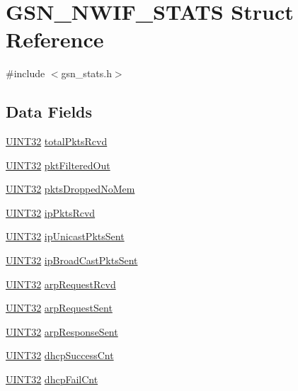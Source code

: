 \hypertarget{a00176}{
\section{GSN\_\-NWIF\_\-STATS Struct Reference}
\label{a00176}
}


{\ttfamily \#include $<$gsn\_\-stats.h$>$}

\subsection*{Data Fields}
\begin{DoxyCompactItemize}
\item 
\hyperlink{a00660_gae1e6edbbc26d6fbc71a90190d0266018}{UINT32} \hyperlink{a00176_a05ef4606fe87c63ea580827f8de8154a}{totalPktsRcvd}
\item 
\hyperlink{a00660_gae1e6edbbc26d6fbc71a90190d0266018}{UINT32} \hyperlink{a00176_a749aa965c1b0568a2852a53557e019cc}{pktFilteredOut}
\item 
\hyperlink{a00660_gae1e6edbbc26d6fbc71a90190d0266018}{UINT32} \hyperlink{a00176_ad206d718956ea79ad16f513d70d7f20f}{pktsDroppedNoMem}
\item 
\hyperlink{a00660_gae1e6edbbc26d6fbc71a90190d0266018}{UINT32} \hyperlink{a00176_ab0853f11aafbd4a050f502595dfe531d}{ipPktsRcvd}
\item 
\hyperlink{a00660_gae1e6edbbc26d6fbc71a90190d0266018}{UINT32} \hyperlink{a00176_aeb59035f4e2e10f2d2cc60150b27d790}{ipUnicastPktsSent}
\item 
\hyperlink{a00660_gae1e6edbbc26d6fbc71a90190d0266018}{UINT32} \hyperlink{a00176_aa1a3da8bb506ae4eea4ac1ed43c8000a}{ipBroadCastPktsSent}
\item 
\hyperlink{a00660_gae1e6edbbc26d6fbc71a90190d0266018}{UINT32} \hyperlink{a00176_adf14eda1e1bc8fa9706de4ca43d9bb95}{arpRequestRcvd}
\item 
\hyperlink{a00660_gae1e6edbbc26d6fbc71a90190d0266018}{UINT32} \hyperlink{a00176_a5019f70fcbe841b145b513f3cc9c156d}{arpRequestSent}
\item 
\hyperlink{a00660_gae1e6edbbc26d6fbc71a90190d0266018}{UINT32} \hyperlink{a00176_a5a9875f4c03bf39064614bf9ccf24cb9}{arpResponseSent}
\item 
\hyperlink{a00660_gae1e6edbbc26d6fbc71a90190d0266018}{UINT32} \hyperlink{a00176_a871dafda0f530184fb2d80cca23222f3}{dhcpSuccessCnt}
\item 
\hyperlink{a00660_gae1e6edbbc26d6fbc71a90190d0266018}{UINT32} \hyperlink{a00176_a8bfe92e5f2f56b9c5ccc8f8d9c69146d}{dhcpFailCnt}
\end{DoxyCompactItemize}


